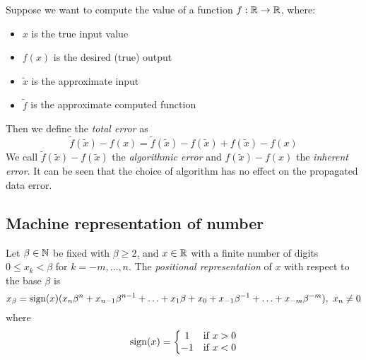 

Suppose we want to compute the value of a function $f: \mathbb{R} \rightarrow \mathbb{R}$, where:

\begin{itemize}
    \item $x$ is the true input value
    \item $f(x)$ is the desired (true) output
    \item $\tilde{x}$ is the approximate input
    \item $\tilde{f}$ is the approximate computed function
\end{itemize}

Then we define the \textit{total error} as
$$ \tilde{f}(\tilde{x}) - f(x) = \tilde{f}(\tilde{x}) - f(\tilde{x}) + f(\tilde{x}) - f(x) $$
We call $\tilde{f}(\tilde{x}) - f(\tilde{x})$ the \textit{algorithmic error} and $f(\tilde{x}) - f(x)$ the \textit{inherent error}. It can be seen that the choice of algorithm has no effect on the propagated data error.




\subsection{Machine representation of number}

Let $\beta \in \mathbb{N}$ be fixed with $\beta \geq 2$, and $x \in \mathbb{R}$ with a finite number of digits $0 \leq x_k < \beta$ for $k = -m, \hdots, n$. The \textit{positional representation} of $x$ with respect to the base $\beta$ is
$$ x_{\beta} = \mathrm{sign}(x)(x_{n}\beta^{n} + x_{n-1}\beta^{n-1} + \hdots + x_{1}\beta + x_{0} + x_{-1}\beta^{-1} + \hdots + x_{-m}\beta^{-m}),\ x_n \neq 0 $$
where
$$ \mathrm{sign}(x) = \left\{ \begin{matrix} 1 & \text{if}\ x > 0 \\ -1 & \text{if}\ x < 0 \end{matrix} \right. $$

